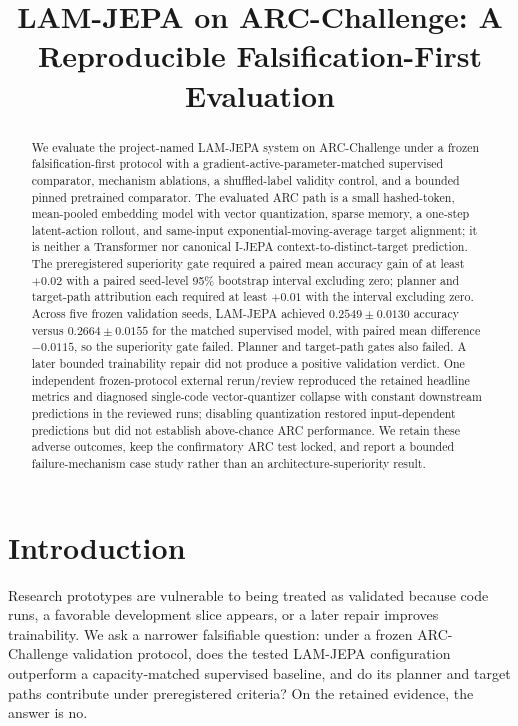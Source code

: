 \documentclass[10pt,conference]{IEEEtran}
\title{LAM-JEPA on ARC-Challenge: A Reproducible Falsification-First Evaluation}
\author{\IEEEauthorblockN{\textit{FIRST AUTHOR -- OWNER APPROVAL REQUIRED}}
\IEEEauthorblockA{High School Student\\
\textit{School / city / country -- OWNER APPROVAL REQUIRED}\\
\textit{Email -- OWNER APPROVAL REQUIRED}}}
\begin{document}
\maketitle

\begin{abstract}
We evaluate the project-named LAM-JEPA system on ARC-Challenge under a frozen falsification-first protocol with a gradient-active-parameter-matched supervised comparator, mechanism ablations, a shuffled-label validity control, and a bounded pinned pretrained comparator. The evaluated ARC path is a small hashed-token, mean-pooled embedding model with vector quantization, sparse memory, a one-step latent-action rollout, and same-input exponential-moving-average target alignment; it is neither a Transformer nor canonical I-JEPA context-to-distinct-target prediction. The preregistered superiority gate required a paired mean accuracy gain of at least $+0.02$ with a paired seed-level 95\% bootstrap interval excluding zero; planner and target-path attribution each required at least $+0.01$ with the interval excluding zero. Across five frozen validation seeds, LAM-JEPA achieved $0.2549\pm0.0130$ accuracy versus $0.2664\pm0.0155$ for the matched supervised model, with paired mean difference $-0.0115$, so the superiority gate failed. Planner and target-path gates also failed. A later bounded trainability repair did not produce a positive validation verdict. One independent frozen-protocol external rerun/review reproduced the retained headline metrics and diagnosed single-code vector-quantizer collapse with constant downstream predictions in the reviewed runs; disabling quantization restored input-dependent predictions but did not establish above-chance ARC performance. We retain these adverse outcomes, keep the confirmatory ARC test locked, and report a bounded failure-mechanism case study rather than an architecture-superiority result.
\end{abstract}

\section{Introduction}
Research prototypes are vulnerable to being treated as validated because code runs, a favorable development slice appears, or a later repair improves trainability. We ask a narrower falsifiable question: under a frozen ARC-Challenge validation protocol, does the tested LAM-JEPA configuration outperform a capacity-matched supervised baseline, and do its planner and target paths contribute under preregistered criteria? On the retained evidence, the answer is no.
\end{document}
